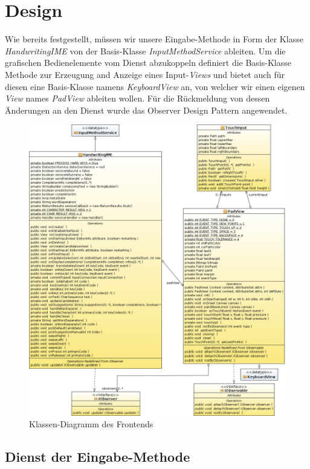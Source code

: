 \section{Design}

Wie bereits festgestellt, müssen wir unsere Eingabe-Methode in Form der Klasse \emph{HandwritingIME} von der Basis-Klasse \emph{InputMethodService} ableiten. Um die grafischen Bedienelemente vom Dienst abzukoppeln definiert die Basis-Klasse Methode zur Erzeugung and Anzeige eines Input-\emph{Views} und bietet auch für diesen eine Basis-Klasse namens \emph{KeyboardView} an, von welcher wir einen eigenen \emph{View} names \emph{PadView} ableiten wollen. Für die Rückmeldung von dessen Änderungen an den Dienst wurde das Observer Design Pattern angewendet\cite[S.293-303]{designpatterns}.

\begin{figure}[h!]
   \centering
   \includegraphics[width=\textwidth]{img/uml_cd_ime} 
   \caption{Klassen-Diagramm des Frontends}
   \label{fig:cd_ime}
\end{figure}

\subsection{Dienst der Eingabe-Methode}

